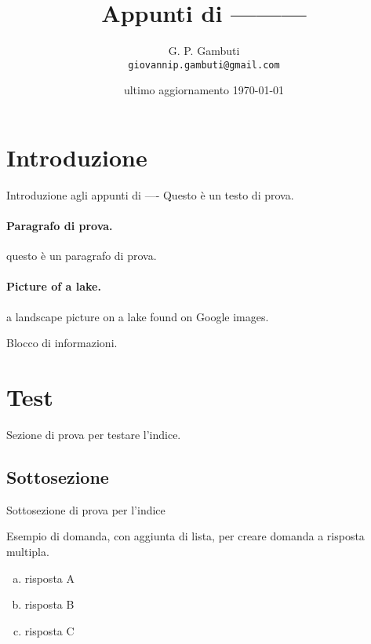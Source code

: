 \documentclass[10pt]{article}
\title{Appunti di ---------}
\author{G. P.   Gambuti\\ \texttt{giovannip.gambuti@gmail.com}}
\date{ultimo aggiornamento  \today}
\begin{document}
\maketitle %
\printindex %

\clearpage

\section*{Introduzione} Introduzione agli appunti di ----
Questo è un testo di prova.


\paragraph{Paragrafo di prova.} questo è un paragrafo di prova.

\begin{center}
\end{center}
\paragraph{Picture of a lake.} a landscape picture on a lake found on Google images.

\begin{info}
Blocco di informazioni. 
\end{info}

\section{Test} Sezione di prova per testare l'indice.
\subsection{Sottosezione} Sottosezione di prova per l'indice


\begin{question}
Esempio di domanda, con aggiunta di lista, per creare domanda a risposta multipla.

	\begin{enumerate}[a)]
		\item risposta A
		\item risposta B
		\item risposta C
	\end{enumerate}

\end{question}
\end{document}
